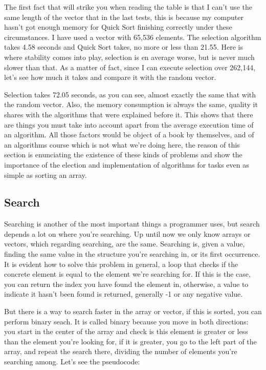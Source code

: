 \documentclass[a4paper]{article}
\begin{document}
The first fact that will strike you when reading the table is that I can't use
the same length of the vector that in the last tests, this is because
my computer hasn't got enough memory for Quick Sort finishing correctly under
these circumstances. I have used a vector with 65,536 elements. The selection
algorithm takes 4.58 seconds and Quick Sort takes, no more or less than 21.55.
Here is where stability comes into play, selection is en average worse,
but is never much slower than that. As a matter of fact, since I can execute
selection over 262,144, let's see how much it takes and compare it with the
random vector.

Selection takes 72.05 seconds, as you can see, almost exactly the same that
with the random vector. Also, the memory consumption is always the same, quality
it shares with the algorithms that were explained before it. This shows that
there are things you must take into account apart from the average execution
time of an algorithm. All those factors would be object of a book by themselves,
and of an algorithms course which is not what we're doing here, the reason of
this section is enunciating the existence of these kinds of problems and show
the importance of the election and implementation of algorithms for tasks even
as simple as sorting an array.

\subsection{Search}
Searching is another of the most important things a programmer uses, but search
depends a lot on where you're searching. Up until now we only know arrays or
vectors, which regarding searching, are the same. Searching is, given a value,
finding the same value in the structure you're searching in, or its first
occurrence. It is evident how to solve this problem in general, a loop that
checks if the concrete element is equal to the element we're searching for. If
this is the case, you can return the index you have found the element in,
otherwise, a value to indicate it hasn't been found is returned, generally -1
or any negative value.

But there is a way to search faster in the array or vector, if this is sorted,
you can perform binary seach. It is called binary because you move in both
directions: you start in the center of the array and check is this element
is greater or less than the element you're looking for, if it is greater, you
go to the left part of the array, and repeat the search there, dividing the
number of elements you're searching among. Let's see the pseudocode:
\end{document}
